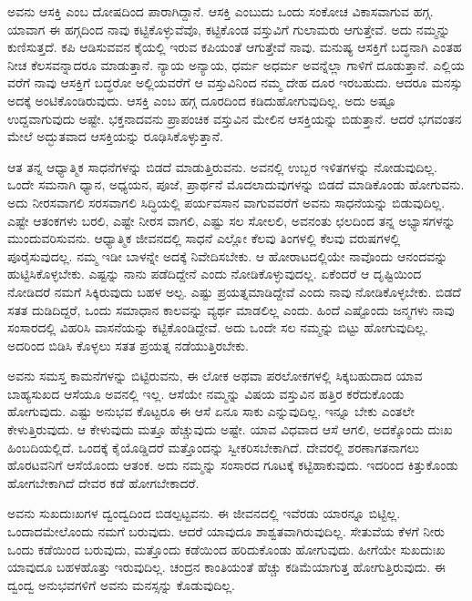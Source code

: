 ಅವನು ಆಸಕ್ತಿ ಎಂಬ ದೋಷದಿಂದ ಪಾರಾಗಿದ್ದಾನೆ. ಆಸಕ್ತಿ ಎಂಬುದು ಒಂದು ಸಂಕೋಚ ವಿಕಾಸವಾಗುವ ಹಗ್ಗ. ಯಾವಾಗ ಈ ಹಗ್ಗದಿಂದ ನಾವು ಕಟ್ಟಿಕೊಳ್ಳುವೆವೊ, ಕಟ್ಟಿಕೊಂಡ ವಸ್ತುವಿಗೆ ಗುಲಾಮರು ಆಗುತ್ತೇವೆ. ಅದು ನಮ್ಮನ್ನು ಕುಣಿಸುತ್ತದೆ. ಕಪಿ ಆಡಿಸುವವನ ಕೈಯಲ್ಲಿ ಇರುವ ಕಪಿಯಂತೆ ಆಗುತ್ತೇವೆ ನಾವು. ಮನುಷ್ಯ ಆಸಕ್ತಿಗೆ ಬದ್ಧನಾಗಿ ಎಂತಹ ನೀಚ ಕೆಲಸವನ್ನಾದರೂ ಮಾಡುತ್ತಾನೆ. ನ್ಯಾಯ ಅನ್ಯಾಯ, ಧರ್ಮ ಅಧರ್ಮ ಅವನ್ನೆಲ್ಲಾ ಗಾಳಿಗೆ ದೂಡುತ್ತಾನೆ. ಎಲ್ಲಿಯ ವರೆಗೆ ನಾವು ಆಸಕ್ತಿಗೆ ಬದ್ಧರೋ ಅಲ್ಲಿಯವರೆಗೆ ಆ ವಸ್ತುವಿನಿಂದ ನಮ್ಮ ದೇಹ ದೂರ ಇರಬಹುದು. ಆದರೂ ಮನಸ್ಸು ಅದಕ್ಕೆ ಅಂಟಿಕೊಂಡಿರುವುದು. ಆಸಕ್ತಿ ಎಂಬ ಹಗ್ಗ ದೂರದಿಂದ ಕಡಿದುಹೋಗುವುದಿಲ್ಲ. ಅದು ಅಷ್ಟೂ ಉದ್ದವಾಗುವುದು ಅಷ್ಟೇ. ಭಕ್ತನಾದವನು ಪ್ರಾಪಂಚಿಕ ವಸ್ತುವಿನ ಮೇಲಿನ ಆಸಕ್ತಿಯನ್ನು ಬಿಡುತ್ತಾನೆ. ಆದರೆ ಭಗವಂತನ ಮೇಲೆ ಅದ್ಭುತವಾದ ಆಸಕ್ತಿಯನ್ನು ರೂಢಿಸಿಕೊಳ್ಳುತ್ತಾನೆ.

ಆತ ತನ್ನ ಆಧ್ಯಾತ್ಮಿಕ ಸಾಧನೆಗಳನ್ನು ಬಿಡದೆ ಮಾಡುತ್ತಿರುವನು. ಅವನಲ್ಲಿ ಉಬ್ಬರ ಇಳಿತಗಳನ್ನು ನೋಡುವುದಿಲ್ಲ. ಒಂದೇ ಸಮನಾಗಿ ಧ್ಯಾನ, ಅಧ್ಯಯನ, ಪೂಜೆ, ಪ್ರಾರ್ಥನೆ ಮೊದಲಾದುವುಗಳನ್ನು ಬಿಡದೆ ಮಾಡಿಕೊಂಡು ಹೋಗುವನು. ಅದು ನೀರಸವಾಗಲಿ ಸರಸವಾಗಲಿ ಸಿದ್ಧಿಯಲ್ಲಿ ಪರ್ಯವಸಾನ ವಾಗುವವರೆಗೆ ಅವನು ಸಾಧನೆಯನ್ನು ಬಿಡುವುದಿಲ್ಲ. ಎಷ್ಟೇ ಆತಂಕಗಳು ಬರಲಿ, ಎಷ್ಟೇ ನೀರಸ ವಾಗಲಿ, ಎಷ್ಟು ಸಲ ಸೋಲಲಿ, ಅವನಂತು ಛಲದಿಂದ ತನ್ನ ಅಭ್ಯಾಸಗಳನ್ನು ಮುಂದುವರಿಸುವನು. ಆಧ್ಯಾತ್ಮಿಕ ಜೀವನದಲ್ಲಿ ಸಾಧನೆ ಎಲ್ಲೋ ಕೆಲವು ತಿಂಗಳಲ್ಲಿ ಕೆಲವು ವರುಷಗಳಲ್ಲಿ ಪೂರೈಸುವುದಲ್ಲ. ನಮ್ಮ ಇಡೀ ಬಾಳನ್ನೇ ಅದಕ್ಕೆ ನಿವೇದಿಸಬೇಕು. ಆ ಹೋರಾಟದಲ್ಲಿಯೇ ನಾವೊಂದು ಆನಂದವನ್ನು ಹುಟ್ಟಿಸಿಕೊಳ್ಳಬೇಕು. ಎಷ್ಟನ್ನು ನಾನು ಪಡೆದಿದ್ದೇನೆ ಎಂದು ನೋಡಿಕೊಳ್ಳುವುದಲ್ಲ. ಏಕೆಂದರೆ ಆ ದೃಷ್ಟಿಯಿಂದ ನೋಡಿದರೆ ನಮಗೆ ಸಿಕ್ಕಿರುವುದು ಬಹಳ ಅಲ್ಪ. ಎಷ್ಟು ಪ್ರಯತ್ನಮಾಡಿದ್ದೇವೆ ಎಂದು ನಾವು ನೋಡಿಕೊಳ್ಳಬೇಕು. ಬಿಡದೆ ಸತತ ದುಡಿದಿದ್ದರೆ, ಒಂದು ಸಮಾಧಾನ ಕಾಲವನ್ನು ವ್ಯರ್ಥ ಮಾಡಲಿಲ್ಲ ಎಂದು. ಹಿಂದೆ ಎಷ್ಟೊಂದು ಜನ್ಮಗಳು ನಾವು ಸಂಸಾರದಲ್ಲಿ ವಿಹರಿಸಿ ವಾಸನೆಯನ್ನು ಕಟ್ಟಿಕೊಂಡಿದ್ದೇವೆ. ಅದು ಒಂದೇ ಸಲ ನಮ್ಮನ್ನು ಬಿಟ್ಟು ಹೋಗುವುದಿಲ್ಲ. ಅದರಿಂದ ಬಿಡಿಸಿ ಕೊಳ್ಳಲು ಸತತ ಪ್ರಯತ್ನ ನಡೆಯುತ್ತಿರಬೇಕು.

ಅವನು ಸಮಸ್ತ ಕಾಮನೆಗಳನ್ನು ಬಿಟ್ಟಿರುವನು, ಈ ಲೋಕ ಅಥವಾ ಪರಲೋಕಗಳಲ್ಲಿ ಸಿಕ್ಕಬಹುದಾದ ಯಾವ ಬಾಹ್ಯಸುಖದ ಆಸೆಯೂ ಅವನಲ್ಲಿ ಇಲ್ಲ. ಆಸೆಯೇ ನಮ್ಮನ್ನು ವಿಷಯ ವಸ್ತುವಿನ ಹತ್ತಿರ ಕರೆದುಕೊಂಡು ಹೋಗುವುದು. ಎಷ್ಟು ಅನುಭವ ಕೊಟ್ಟರೂ ಈ ಆಸೆ ಏನೂ ಸಾಕು ಎನ್ನುವುದಿಲ್ಲ. ಇನ್ನೂ ಬೇಕು ಎಂತಲೇ ಕೇಳುತ್ತಿರುವುದು. ಆ ಕೇಳುವುದು ಮತ್ತೂ ಹೆಚ್ಚುವುದು ಅಷ್ಟೇ. ಯಾವ ವಿಧವಾದ ಆಸೆ ಆಗಲಿ, ಅದಕ್ಕೊಂದು ದುಃಖ ಹಿಂಬದಿಯಲ್ಲಿದೆ. ಒಂದಕ್ಕೆ ಕೈಯೊಡ್ಡಿದರೆ ಮತ್ತೊಂದನ್ನು ಸ್ವೀಕರಿಸಬೇಕಾಗಿದೆ. ದೇವರಲ್ಲಿ ಶರಣಾಗತನಾಗಲು ಹೊರಟವನಿಗೆ ಆಸೆಯೊಂದು ಆತಂಕ. ಅದು ನಮ್ಮನ್ನು ಸಂಸಾರದ ಗೂಟಕ್ಕೆ ಕಟ್ಟಿಹಾಕುವುದು. ಇದರಿಂದ ಕಿತ್ತುಕೊಂಡು ಹೋಗಬೇಕಾಗಿದೆ ದೇವರ ಕಡೆ ಹೋಗಬೇಕಾದರೆ.

ಅವನು ಸುಖದುಃಖಗಳ ದ್ವಂದ್ವದಿಂದ ಬಿಡಲ್ಪಟ್ಟವನು. ಈ ಜೀವನದಲ್ಲಿ ಇವೆರಡು ಯಾರನ್ನೂ ಬಿಟ್ಟಿಲ್ಲ. ಒಂದಾದಮೇಲೊಂದು ನಮಗೆ ಬರುವುದು. ಆದರೆ ಯಾವುದೂ ಶಾಶ್ವತವಾಗಿರುವುದಿಲ್ಲ. ಸೇತುವೆಯ ಕೆಳಗೆ ನೀರು ಒಂದು ಕಡೆಯಿಂದ ಬರುವುದು, ಮತ್ತೊಂದು ಕಡೆಯಿಂದ ಹರಿದುಕೊಂಡು ಹೋಗುವುದು. ಹೀಗೆಯೇ ಸುಖದುಃಖ ಯಾವುದೂ ಬಹಳಹೊತ್ತು ಇರುವುದಿಲ್ಲ. ಚಂದ್ರನ ಕಾಂತಿಯಂತೆ ಹೆಚ್ಚು ಕಡಿಮೆಯಾಗುತ್ತ ಹೋಗುತ್ತಿರುವುದು. ಈ ದ್ವಂದ್ವ ಅನುಭವಗಳಿಗೆ ಅವನು ಮನಸ್ಸನ್ನು ಕೊಡುವುದಿಲ್ಲ.

